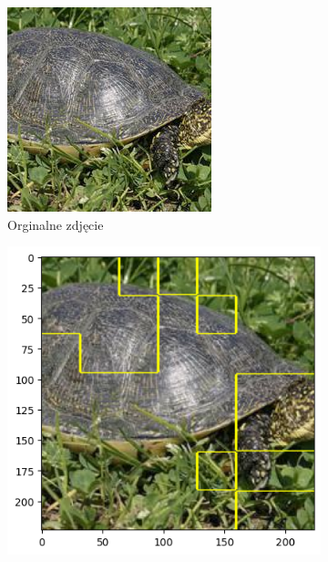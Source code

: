 \begin{figure}[h]
	\centering
	\begin{subfigure}[b]{0.3\textwidth}
		\includegraphics[width=.9\textwidth]{img/examples/appendix/n01667778_32805}
		\caption{Orginalne zdjęcie}  \label{}
	\end{subfigure}
	\begin{subfigure}[b]{0.3\textwidth}
		\centering\includegraphics[width=.9\textwidth]{img/examples/appendix/n01667778_32805_gradcam}

\end{subfigure}
\end{figure}
